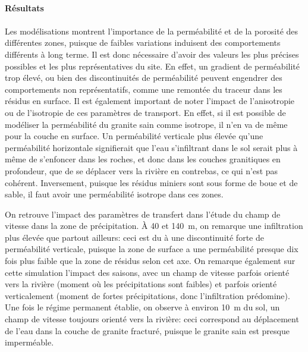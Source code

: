 \documentclass{article}
\begin{document}
\paragraph{Résultats}
\paragraph{}
Les modélisations montrent l’importance de la perméabilité et de la porosité des différentes zones, puisque de faibles variations induisent des comportements différents à long terme. Il est donc nécessaire d’avoir des valeurs les plus précises possibles et les plus représentatives du site. En effet, un gradient de perméabilité trop élevé, ou bien des discontinuités de perméabilité peuvent engendrer des comportements non représentatifs, comme une remontée du traceur dans les résidus en surface. Il est également important de noter l'impact de l'anisotropie ou de l'isotropie de ces paramètres de transport. En effet, si il est possible de modéliser la perméabilité du granite sain comme isotrope, il n'en va de même pour la couche en surface. Un perméabilité verticale plus élevée qu'une perméabilité horizontale signifierait que l'eau s'infiltrant dans le sol serait plus à même de s'enfoncer dans les roches, et donc dans les couches granitiques en profondeur, que de se déplacer vers la rivière en contrebas, ce qui n'est pas cohérent. Inversement, puisque les résidus miniers sont sous forme de boue et de sable, il faut avoir une perméabilité isotrope dans ces zones.

On retrouve l'impact des paramètres de transfert dans l'étude du champ de vitesse dans la zone de précipitation. À 40 et 140~m, on remarque une infiltration plus élevée que partout ailleurs: ceci est du à une discontinuité forte de perméabilité verticale, puisque la zone de surface a une perméabilité presque dix fois plus faible que la zone de résidus selon cet axe. On remarque également sur cette simulation l'impact des saisons, avec un champ de vitesse parfois orienté vers la rivière (moment où les précipitations sont faibles) et parfois orienté verticalement (moment de fortes précipitations, donc l'infiltration prédomine). Une fois le régime permanent établie, on observe à environ 10~m du sol, un champ de vitesse toujours orienté vers la rivière: ceci correspond au déplacement de l'eau dans la couche de granite fracturé, puisque le granite sain est presque imperméable.
\end{document}
